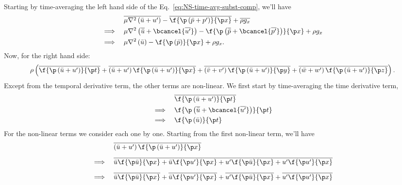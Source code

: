 Starting by time-averaging the left hand side of the Eq.~\ref{eq:NS-time-avg-subst-comp}, we'll have
%
\begin{equation}
\begin{aligned}
    &\overline{\mu \nabla^2 \left(\bar{u} + u^\prime\right)} - \overline{\f{\p \left(\bar{p} + p^\prime\right)}{\p x}} + \overline{\rho g_x} \\
    \implies\quad &\mu \nabla^2 \left(\overline{\bar{u}} + \bcancel{\overline{u^\prime}}\right) - \f{\p \left(\overline{\bar{p}} + \bcancel{\overline{p^\prime}}\right)}{\p x} + \rho g_x \\
    \implies\quad &\mu \nabla^2 \left(\bar{u}\right) - \f{\p \left(\bar{p}\right)}{\p x} + \rho g_x.
\end{aligned}
  \label{eq:NS-time-averaged-lhs}
\end{equation}
%
Now, for the right hand side:
%
\begin{equation}
  \rho
  \left(
    \overline{\f{\p \left(\bar{u} + u^\prime\right)}{\p t}}
  + \overline{\left(\bar{u} + u^\prime\right) \f{\p \left(\bar{u} + u^\prime\right)}{\p x}}
  + \overline{\left(\bar{v} + v^\prime\right) \f{\p \left(\bar{u} + u^\prime\right)}{\p y}}
  + \overline{\left(\bar{w} + w^\prime\right) \f{\p \left(\bar{u} + u^\prime\right)}{\p z}}
  \right). \\
  \label{eq:NS-time-averaged-rhs}
\end{equation}
%
Except from the temporal derivative term, the other terms are non-linear.
We first start by time-averaging the time derivative term,
%
\begin{equation}
\begin{aligned}
  &\overline{\f{\p \left(\bar{u} + u^\prime\right)}{\p t}} \\
  \implies\quad &\f{\p \left(\overline{\bar{u}} + \bcancel{\overline{u^\prime}}\right)}{\p t} \\
  \implies\quad &\f{\p \left(\bar{u}\right)}{\p t}
\end{aligned}
  \label{eq:NS-time-averaged-rhs-ddt}
\end{equation}
%
For the non-linear terms we consider each one by one.
Starting from the first non-linear term, we'll have
%
\begin{equation}
  \begin{aligned}
  &\overline{\left(\bar{u} + u^\prime\right) \f{\p \left(\bar{u} + u^\prime\right)}{\p x}} \\[5pt]
  \implies\quad
  &\overline{
    \bar{u} \f{\p \bar{u}}{\p x} + \bar{u} \f{\p u^\prime}{\p x}
    + u^\prime \f{\p \bar{u}}{\p x} + u^\prime \f{\p u^\prime}{\p x}
  } \\[5pt]
  \implies\quad
  &\overline{\bar{u} \f{\p \bar{u}}{\p x}}
  + \overline{\bar{u} \f{\p u^\prime}{\p x}}
  + \overline{u^\prime \f{\p \bar{u}}{\p x}}
  + \overline{u^\prime \f{\p u^\prime}{\p x}}
  \label{eq:NS-time-averaged-rhs-nonlinear-first-term-x}
  \end{aligned}
\end{equation}
